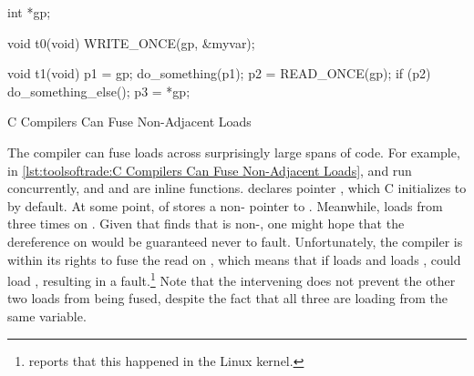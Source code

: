 \begin{description}[labelsep=.4em]
\begin{listing}
\begin{fcvlabel}
\begin{VerbatimLL}[commandchars=\\\[\]]
int *gp; \lnlbl[gp]

void t0(void)
{
	WRITE_ONCE(gp, &myvar); \lnlbl[wgp]
}

void t1(void)
{
	p1 = gp; \lnlbl[p1]
	do_something(p1);
	p2 = READ_ONCE(gp); \lnlbl[p2]
	if (p2) { \lnlbl[if]
		do_something_else();
		p3 = *gp; \lnlbl[p3]
	}
}
\end{VerbatimLL}
\end{fcvlabel}
\caption{C Compilers Can Fuse Non-Adjacent Loads}
\label{lst:toolsoftrade:C Compilers Can Fuse Non-Adjacent Loads}
\end{listing}

\begin{fcvref}
The compiler can fuse loads across surprisingly large spans of code.
For example, in
\cref{lst:toolsoftrade:C Compilers Can Fuse Non-Adjacent Loads},
 and  run concurrently, and  and
 are inline functions.
 declares pointer , which C initializes to 
by default.
At some point,  of  stores a non-
pointer to .
Meanwhile,  loads from  three times on
.
Given that  finds that  is non-, one might
hope that the dereference on  would be guaranteed never
to fault.
Unfortunately, the compiler is within its rights to fuse the read on
, which means that if 
loads  and  loads , 
could load , resulting in a fault.\footnote{
	 reports that this happened in the Linux kernel.}
Note that the intervening  does not prevent the other
two loads from being fused, despite the fact that all three are loading
from the same variable.
\end{fcvref}

\QuickQuizEnd


\end{description}
